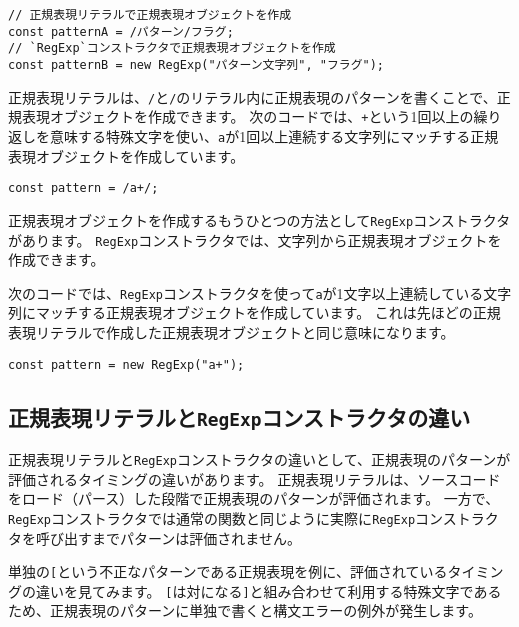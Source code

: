 \begin{lstlisting}
// 正規表現リテラルで正規表現オブジェクトを作成
const patternA = /パターン/フラグ;
// `RegExp`コンストラクタで正規表現オブジェクトを作成
const patternB = new RegExp("パターン文字列", "フラグ");
\end{lstlisting}

正規表現リテラルは、\texttt{/}と\texttt{/}のリテラル内に正規表現のパターンを書くことで、正規表現オブジェクトを作成できます。
次のコードでは、\texttt{+}という1回以上の繰り返しを意味する特殊文字を使い、\texttt{a}が1回以上連続する文字列にマッチする正規表現オブジェクトを作成しています。

\begin{lstlisting}
const pattern = /a+/;
\end{lstlisting}

正規表現オブジェクトを作成するもうひとつの方法として\texttt{RegExp}コンストラクタがあります。
\texttt{RegExp}コンストラクタでは、文字列から正規表現オブジェクトを作成できます。

次のコードでは、\texttt{RegExp}コンストラクタを使って\texttt{a}が1文字以上連続している文字列にマッチする正規表現オブジェクトを作成しています。
これは先ほどの正規表現リテラルで作成した正規表現オブジェクトと同じ意味になります。

\begin{lstlisting}
const pattern = new RegExp("a+");
\end{lstlisting}

\hypertarget{difference-regexp-literal-regexp-constructor}{%
\subsection{\texorpdfstring{正規表現リテラルと\texttt{RegExp}コンストラクタの違い}{正規表現リテラルとRegExpコンストラクタの違い}}\label{difference-regexp-literal-regexp-constructor}}

正規表現リテラルと\texttt{RegExp}コンストラクタの違いとして、正規表現のパターンが評価されるタイミングの違いがあります。
正規表現リテラルは、ソースコードをロード（パース）した段階で正規表現のパターンが評価されます。
一方で、\texttt{RegExp}コンストラクタでは通常の関数と同じように実際に\texttt{RegExp}コンストラクタを呼び出すまでパターンは評価されません。

単独の\texttt{[}という不正なパターンである正規表現を例に、評価されているタイミングの違いを見てみます。
\texttt{[}は対になる\texttt{]}と組み合わせて利用する特殊文字であるため、正規表現のパターンに単独で書くと構文エラーの例外が発生します。

